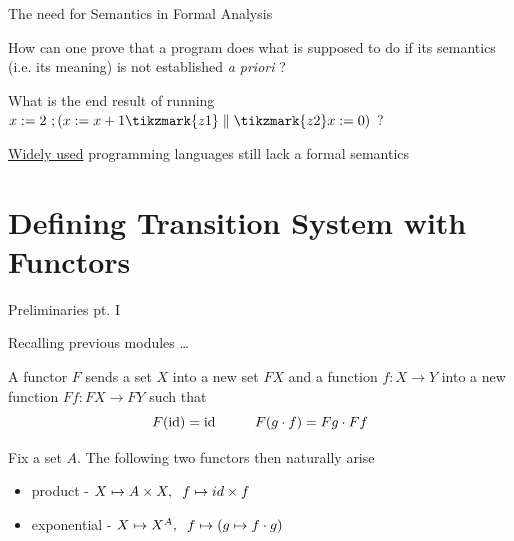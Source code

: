 \documentclass[aspectratio=169]{beamer}
\begin{document}
\begin{frame}{The need for Semantics in Formal Analysis}

  How can one prove that a program does what is supposed to do if its
  semantics (i.e. its meaning) is not established \emph{a priori} ?

  \begin{exampleblock}{\exercise}
    What is the end result of running
    $x:=2\ ; (x := x + 1 \tikzmark{z1}  \parallel  \tikzmark{z2} x := 0)$ ?
  \end{exampleblock}



   \vfill
   \underline{Widely used} programming languages \alert{still} lack a formal
   semantics
\end{frame}


\section{Defining Transition System with Functors}

\begin{frame}{Preliminaries pt. I}

  Recalling previous modules \dots

  \vfill
  \begin{definition}[Functor]
    A functor $F$ sends a set $X$ into a new set $FX$ and a function
    $f : X \to Y$ into a new function $F f : F X \to F Y$ such that
    \[
      F (\mathrm{id}) = \mathrm{id}  \hspace{1cm} F(g \cdot f) = F g \cdot F f
    \]
  \end{definition}

  Fix a set $A$. The following two functors then naturally arise
  \begin{itemize}
  \item product - $X \mapsto A \times X, \hspace{0.2cm} f \mapsto id \times f$
  \item exponential - $X \mapsto X^A, \hspace{0.2cm} f \mapsto (g \mapsto f \cdot g)$
  \end{itemize}
\end{frame}
\end{document}
